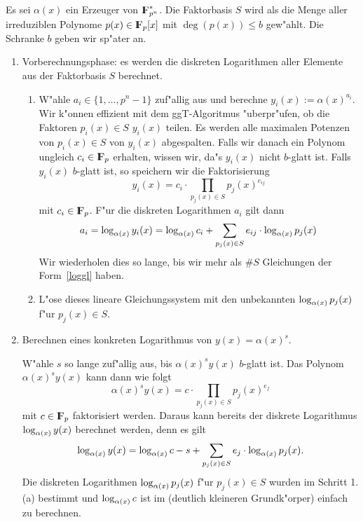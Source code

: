 Es sei $\alpha(x)$ ein Erzeuger von $\koerper{p^n}^*$. Die Faktorbasis
$S$ wird als die Menge aller irreduziblen Polynome $p(x)\in\koerper{p}[x]$ 
mit $\deg(p(x)) \le b$ gew"ahlt. Die Schranke $b$ geben wir sp"ater an.
\begin{enumerate}
  \item Vorberechnungsphase: es werden die diskreten Logarithmen aller 
    Elemente aus der Faktorbasis $S$ berechnet.
    \begin{enumerate}
      \item W"ahle $a_i\in\{1,\ldots,p^n-1\}$ zuf"allig aus und
        berechne $y_i(x) := \alpha(x)^{a_i}$.  
        Wir k"onnen effizient mit dem ggT-Algoritmus "uberpr"ufen, ob
        die Faktoren $p_i(x)\in S$ $y_i(x)$ teilen. Es werden alle
        maximalen Potenzen von $p_i(x)\in S$ von $y_i(x)$ abgespalten.
        Falls wir danach ein Polynom ungleich $c_i\in\koerper{p}$
        erhalten, wissen wir, da"s $y_i(x)$ nicht $b$-glatt ist.
        Falls $y_i(x)$ $b$-glatt ist, so speichern wir die Faktorisierung
        $$ y_i(x) = c_i \cdot \prod_{p_j(x)\in S} p_j(x)^{e_{ij}} $$ mit
        $c_i\in\koerper{p}$. F"ur die diskreten Logarithmen $a_i$
        gilt dann
        \begin{equation} a_i = \log_{\alpha(x)} y_i(x) =
            \log_{\alpha(x)} c_i + \sum_{p_j(x)\in S} e_{ij} \cdot
            \log_{\alpha(x)} p_j(x) \label{loggl} 
        \end{equation}
        Wir wiederholen dies so lange, bis wir mehr als $\#S$ Gleichungen
        der Form~\ref{loggl} haben. 
      \item 
        L"ose dieses lineare Gleichungssystem mit den unbekannten
        $\log_{\alpha(x)} p_j(x)$ f"ur $p_j(x)\in S$.
    \end{enumerate}

  \item Berechnen eines konkreten Logarithmus von $y(x)=\alpha(x)^{s}$. 

        W"ahle $s$ so lange zuf"allig aus, bis $\alpha(x)^s y(x)$
        $b$-glatt ist. Das Polynom $\alpha(x)^s y(x)$ kann dann wie folgt
        $$ \alpha(x)^s y(x) = c \cdot \prod_{p_j(x)\in S} p_j(x)^{e_j} $$
        mit $c\in\koerper{p}$ faktorisiert werden. Daraus kann
        bereits der diskrete Logarithmus $\log_{\alpha(x)} y(x)$ berechnet
        werden, denn es gilt
        $$ \log_{\alpha(x)} y(x) = \log_{\alpha(x)} c - s +
        \sum_{p_j(x)\in S} e_{j} \cdot \log_{\alpha(x)} p_j(x). $$ 
        Die diskreten Logarithmen $\log_{\alpha(x)} p_j(x)$ f"ur $p_j(x)\in
        S$ wurden im Schritt 1.(a) bestimmt und $\log_{\alpha(x)} c$
        ist im (deutlich kleineren Grundk"orper) einfach zu berechnen.
\end{enumerate}

